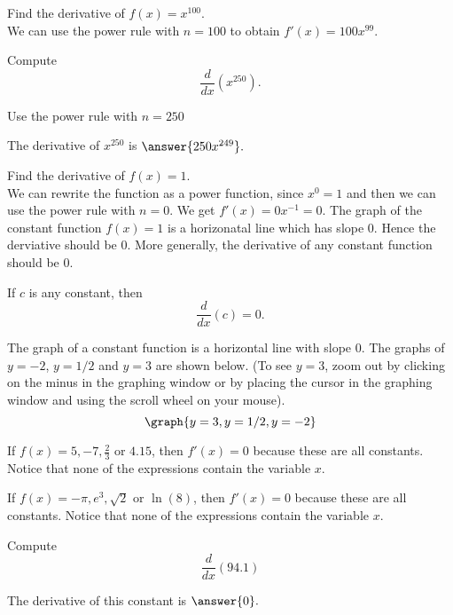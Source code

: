 \documentclass{ximera}
\begin{document}
\begin{example} %
Find the derivative of $f(x) = x^{100}$.\\
We can use the power rule with $n = 100$ to obtain $f'(x) = 100x^{99}.$
\end{example}

\begin{problem}
Compute
\[
\frac{d}{dx} \left(x^{250}\right).
\]
\begin{hint}
Use the power rule with $n = 250$
\end{hint}
The derivative of $x^{250}$ is $\answer{250x^{249}}.$
\end{problem}



\begin{example} %
Find the derivative of $f(x) = 1$.\\
We can rewrite the function as a power function, since $x^0 = 1$ and then we can use the power rule with $n=0$. We get $f'(x) = 0x^{-1} = 0$. 
The graph of the constant function $f(x) = 1$ is a horizonatal line which has slope 0. Hence the derviative should be 0.
More generally, the derivative of any constant function should be 0.
\end{example}

\begin{proposition}
If $c$ is any constant, then
\[
\frac{d}{dx} \left(c\right) = 0.
\]
\end{proposition}

The graph of a constant function is a horizontal line with slope 0.
The graphs of $y = -2$, $y = 1/2$ and $y = 3$ are shown below.
(To see $y=3$, zoom out by clicking on the minus in the graphing window or 
by placing the cursor in the graphing window and using the scroll wheel on your mouse).
\[
\graph{y = 3, y = 1/2, y = -2}
\]

\begin{example} %
If $f(x) = 5, -7, \frac23$ or $4.15$, then $f'(x) = 0$ 
because these are all constants. Notice that none of the expressions contain the variable $x$.
\end{example}


\begin{example} %
If $f(x) = -\pi, e^3, \sqrt 2$ or $\ln(8)$, then $f'(x) = 0$ 
because these are all constants. Notice that none of the expressions contain the variable $x$.
\end{example}

\begin{problem}
Compute
\[
\frac{d}{dx} \left(94.1\right) 
\]

The derivative of this constant is  $\answer{0}.$
\end{problem}
\end{document}
